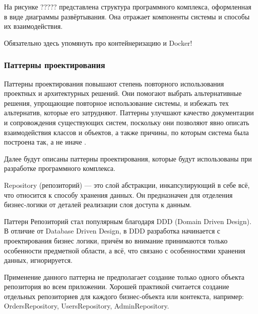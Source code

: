 На рисунке ????? представлена структура программного комплекса, оформленная в виде диаграммы развёртывания. Она отражает компоненты системы и способы их взаимодействия. 

Обязательно здесь упомянуть про контейнеризацию и Docker!






\subsubsection{Паттерны проектирования}

Паттерны проектирования повышают степень повторного использования проектных и архитектурных решений. Они помогают выбрать альтернативные решения, упрощающие повторное использование системы, и избежать тех альтернатив, которые его затрудняют. Паттерны улучшают качество документации и сопровождения существующих систем, поскольку они позволяют явно описать взаимодействия классов и объектов, а также причины, по которым система была построена так, а не иначе \cite{patterns}.

Далее будут описаны паттерны проектирования, которые будут использованы при разработке программного комплекса.



Repository (репозиторий) \cite{repository_pattern} --- это слой абстракции, инкапсулирующий в себе всё, что относится к способу хранения данных. Он предназначен для отделения бизнес-логики от деталей реализации слоя доступа к данным.

Паттерн Репозиторий стал популярным благодаря DDD (Domain Driven Design). В отличие от Database Driven Design, в DDD разработка начинается с проектирования бизнес логики, причём во внимание принимаются только особенности предметной области, а всё, что связано с особенностями хранения данных, игнорируется.

Применение данного паттерна не предполагает создание только одного объекта репозитория во всем приложении. Хорошей практикой считается создание отдельных репозиториев для каждого бизнес-объекта или контекста, например: OrdersRepository, UsersRepository, AdminRepository.

